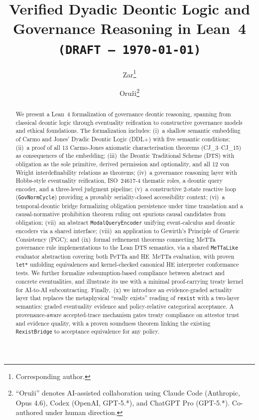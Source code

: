 \documentclass[]{article}
\title{Verified Dyadic Deontic Logic and Governance Reasoning in Lean~4\\
  \texttt{(DRAFT --- \today)}}
\author{Zar\footnote{Corresponding author.}
\and Oru\v{z}i\footnote{``Oru\v{z}i'' denotes AI-assisted collaboration
using Claude Code (Anthropic, Opus 4.6), Codex (OpenAI, GPT-5.*), and
ChatGPT Pro (GPT-5.*). Co-authored under human direction.}}
\newcommand{\code}[1]{\texttt{#1}}
\newcommand{\DDL}{\textup{DDL+}}
\newcommand{\DTS}{\textup{DTS}}
\newcommand{\PGC}{\textup{PGC}}
\begin{document}
\maketitle

\begin{abstract}
We present a Lean~4 formalization of governance deontic reasoning,
spanning from classical deontic logic through eventuality reification to
constructive governance models and ethical foundations.
The formalization includes:
(i)~a shallow semantic embedding of Carmo and Jones' Dyadic Deontic Logic (\DDL{})
with five semantic conditions;
(ii)~a proof of all 13 Carmo-Jones axiomatic characterisation theorems (CJ\_3--CJ\_15)
as consequences of the embedding;
(iii)~the Deontic Traditional Scheme (\DTS{}) with obligation as the sole primitive,
derived permission and optionality, and all 12 von Wright interdefinability relations
as theorems;
(iv)~a governance reasoning layer with Hobbs-style eventuality reification, ISO~24617-4
thematic roles, a deontic query encoder, and a three-level judgment pipeline;
(v)~a constructive 2-state reactive loop (\code{GovNormCycle}) providing a provably
seriality-closed accessibility context;
(vi)~a temporal-deontic bridge formalizing obligation persistence under time translation
and a causal-normative prohibition theorem ruling out spurious causal candidates from
obligation;
(vii)~an abstract \code{ModalQueryEncoder} unifying event-calculus and deontic encoders
via a shared interface;
(viii)~an application to Gewirth's Principle of Generic
Consistency (\PGC{}); and
(ix)~formal refinement theorems connecting MeTTa governance rule implementations
to the Lean \DTS{} semantics, via a shared \code{MeTTaLike} evaluator abstraction
covering both PeTTa and HE~MeTTa evaluation, with proven \code{let*} unfolding
equivalences and kernel-checked canonical HE interpreter conformance tests.
We further formalize subsumption-based compliance between abstract and concrete
eventualities, and illustrate its use with a minimal proof-carrying treaty
kernel for AI-to-AI subcontracting.
Finally,~(x) we introduce an evidence-graded actuality layer that replaces the
metaphysical ``really exists'' reading of \code{rexist} with a two-layer
semantics: graded eventuality evidence and policy-relative categorical
acceptance.  A provenance-aware accepted-trace mechanism gates treaty
compliance on attestor trust and evidence quality, with a proven
soundness theorem linking the existing \code{RexistBridge} to
acceptance equivalence for any policy.
\end{abstract}
\end{document}
